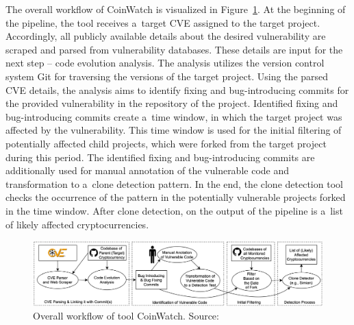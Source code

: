     The overall workflow of CoinWatch is visualized in Figure~\ref{coinwatch-workflow}. At the beginning
    of the pipeline, the tool receives a~target CVE assigned to the target project. Accordingly, all publicly
    available details about the desired vulnerability are scraped and parsed from vulnerability databases.
    These details are input for the next step -- code evolution analysis. The analysis utilizes the version
    control system Git for traversing the versions of the target project. Using the parsed CVE details,
    the analysis aims to identify fixing and bug-introducing commits for the provided vulnerability
    in the repository of the project. Identified fixing and bug-introducing commits create a~time window, in which
    the target project was affected by the vulnerability. This time window is used for the initial filtering
    of potentially affected child projects, which were forked from the target project during this period.
    The identified fixing and bug-introducing commits are additionally used for manual annotation of
    the vulnerable code and transformation to a~clone detection pattern. In the end, the clone detection tool
    checks the occurrence of the pattern in the potentially vulnerable projects forked in the time window.
    After clone detection, on the output of the pipeline is a~list of likely affected cryptocurrencies.

    \begin{figure}[h]
      \centering
      \includegraphics[width=1\textwidth]{obrazky-figures/coinwatch_workflow.png}
      \caption{Overall workflow of tool CoinWatch. Source:~\cite{CoinWatch}}
      \label{coinwatch-workflow}
    \end{figure}

